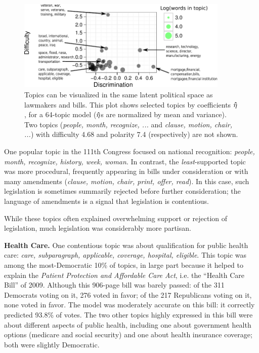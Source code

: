 \begin{figure}
  \center
  \includegraphics[width=0.9\textwidth]{chapter_predicting_votes_with_text/figures/134_64_topic_plot.pdf}
  \caption{Topics can be visualized in the same latent political space
    as lawmakers and bills.  This plot shows selected topics by
    coefficients $\bm \hat \eta$, for a 64-topic model ($\bm \hat \eta$s are normalized by
    mean and variance).  Two topics (\emph{people, month, recognize, ...}
    and \emph{clause, motion, chair, ...}) with difficulty 4.68 and
    polarity 7.4 (respectively) are not shown.}
  \label{fig:topics}
\end{figure}

One popular topic in the 111th Congress focused on national
recognition: \emph{people, month, recognize, history, week, woman}.
In contrast, the \emph{least}-supported topic was more procedural,
frequently appearing in bills under consideration or with many
amendments (\emph{clause, motion, chair, print, offer, read}).  In
this case, such legislation is sometimes summarily rejected before
further consideration; the language of amendments is a signal that
legislation is contentious.

While these topics often explained overwhelming support or rejection
of legislation, much legislation was considerably more partisan.

\textbf{Health Care.}  One contentious topic was about
qualification for public health care: \emph{care, subparagraph,
applicable, coverage, hospital, eligible}.  This topic was among the
most-Democratic 10\% of topics, in large part because it helped to
explain the \emph{Patient Protection and Affordable Care Act},
i.e. the ``Health Care Bill'' of 2009.  Although this 906-page bill
was barely passed: of the 311 Democrats voting on
it, 276 voted in favor; of the 217 Republicans voting on it, none
voted in favor.  The model was moderately accurate on this bill: it
correctly predicted 93.8\% of votes.  The two other topics highly
expressed in this bill were about different aspects of public health,
including one about government health options (medicare and social
security) and one about health insurance coverage; both were slightly
Democratic.

